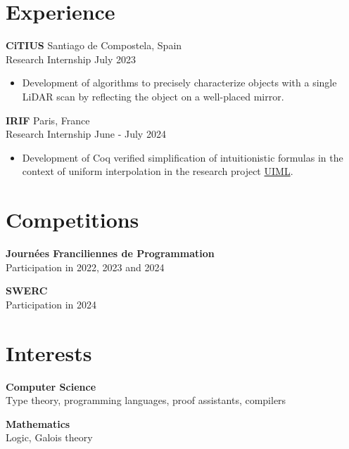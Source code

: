 \documentclass[12pt]{article}
\newcommand{\entry}[4]{{{\textbf{#1}}} \hfill #3 \\ #2 \hfill #4}
\begin{document}
\begin{paracol}{2}
	\switchcolumn*

	\section{Experience}

	\entry{CiTIUS}{Research Internship}{Santiago de Compostela, Spain}{July 2023}
	\begin{itemize}[noitemsep,leftmargin=3.5mm,rightmargin=0mm,topsep=6pt]
		\item Development of algorithms to precisely characterize objects with a single LiDAR scan by reflecting the object on a well-placed mirror.
	\end{itemize}

	\entry{IRIF}{Research Internship}{Paris, France}{June - July 2024}
	\begin{itemize}[noitemsep,leftmargin=3.5mm,rightmargin=0mm,topsep=6pt]
		\item Development of Coq verified simplification of intuitionistic formulas in the context of uniform interpolation in the research project \href{https://github.com/hferee/UIML}{UIML}.
	\end{itemize}

	\switchcolumn

	\section{Competitions}

	\textbf{Journées Franciliennes de Programmation}\\
	\noindent Participation in 2022, 2023 and 2024

	\textbf{SWERC}\\
	\noindent Participation in 2024

\end{paracol}

\section{Interests}

\begin{paracol}{2}

	\entry{Computer Science}{Type theory, programming languages, proof assistants, compilers}{ }{ }

	\switchcolumn

	\entry{Mathematics}{Logic, Galois theory}{ }{ }
\end{paracol}
\end{document}
